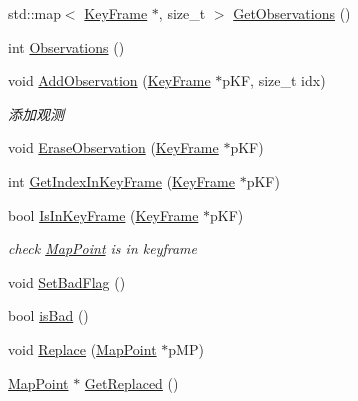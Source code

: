 \begin{DoxyCompactItemize}
\item 
std\+::map$<$ \mbox{\hyperlink{class_o_r_b___s_l_a_m2_1_1_key_frame}{Key\+Frame}} $\ast$, size\+\_\+t $>$ \mbox{\hyperlink{class_o_r_b___s_l_a_m2_1_1_map_point_ae91e056d3b79e08a3fadd976888f6b09}{Get\+Observations}} ()
\item 
int \mbox{\hyperlink{class_o_r_b___s_l_a_m2_1_1_map_point_a7fbc2a95f49eb6facdc5d5fa35de3287}{Observations}} ()
\item 
void \mbox{\hyperlink{class_o_r_b___s_l_a_m2_1_1_map_point_a37277ee3c7d8657976e749ab920bb13f}{Add\+Observation}} (\mbox{\hyperlink{class_o_r_b___s_l_a_m2_1_1_key_frame}{Key\+Frame}} $\ast$p\+KF, size\+\_\+t idx)
\begin{DoxyCompactList}\small\item\em 添加观测 \end{DoxyCompactList}\item 
void \mbox{\hyperlink{class_o_r_b___s_l_a_m2_1_1_map_point_a79e6a93ea0c39329a082f4f69560f1be}{Erase\+Observation}} (\mbox{\hyperlink{class_o_r_b___s_l_a_m2_1_1_key_frame}{Key\+Frame}} $\ast$p\+KF)
\item 
int \mbox{\hyperlink{class_o_r_b___s_l_a_m2_1_1_map_point_afbe3f2cf7f4d5e4596fa9f7ff0d44470}{Get\+Index\+In\+Key\+Frame}} (\mbox{\hyperlink{class_o_r_b___s_l_a_m2_1_1_key_frame}{Key\+Frame}} $\ast$p\+KF)
\item 
bool \mbox{\hyperlink{class_o_r_b___s_l_a_m2_1_1_map_point_a7a8c48a885598ba4da3b188791dfd009}{Is\+In\+Key\+Frame}} (\mbox{\hyperlink{class_o_r_b___s_l_a_m2_1_1_key_frame}{Key\+Frame}} $\ast$p\+KF)
\begin{DoxyCompactList}\small\item\em check \mbox{\hyperlink{class_o_r_b___s_l_a_m2_1_1_map_point}{Map\+Point}} is in keyframe \end{DoxyCompactList}\item 
void \mbox{\hyperlink{class_o_r_b___s_l_a_m2_1_1_map_point_a7ed2a66b528165d6c39cb6f84f684308}{Set\+Bad\+Flag}} ()
\item 
bool \mbox{\hyperlink{class_o_r_b___s_l_a_m2_1_1_map_point_a46bb6b57cd914c9ebad30007f3af469a}{is\+Bad}} ()
\item 
void \mbox{\hyperlink{class_o_r_b___s_l_a_m2_1_1_map_point_a8f2e205afcfae3dc70196bcd29194440}{Replace}} (\mbox{\hyperlink{class_o_r_b___s_l_a_m2_1_1_map_point}{Map\+Point}} $\ast$p\+MP)
\item 
\mbox{\hyperlink{class_o_r_b___s_l_a_m2_1_1_map_point}{Map\+Point}} $\ast$ \mbox{\hyperlink{class_o_r_b___s_l_a_m2_1_1_map_point_ad8814ed8121bd730c640c620ed623baf}{Get\+Replaced}} ()

\end{DoxyCompactItemize}
